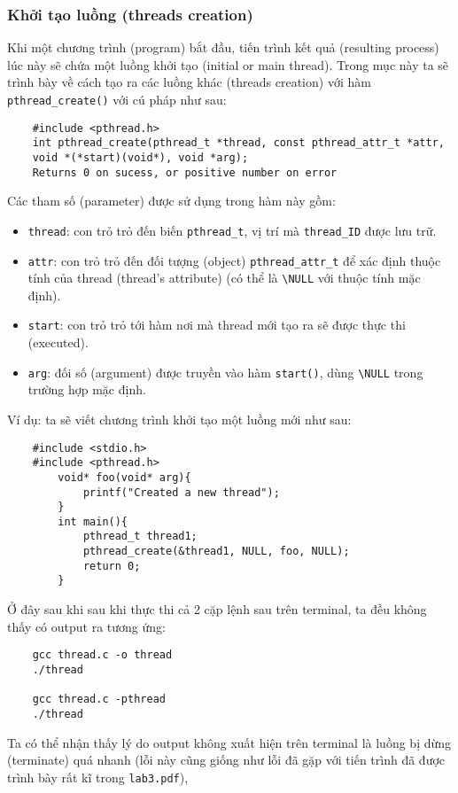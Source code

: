 \documentclass{article}
\begin{document}
\subsubsection{Khởi tạo luồng (threads creation)}
Khi một chương trình (program) bắt đầu, tiến trình kết quả (resulting process) lúc này sẽ chứa một luồng khởi tạo (initial or main thread).
Trong mục này ta sẽ trình bày về cách tạo ra các luồng khác (threads creation) với hàm \verb|pthread_create()| với cú pháp như sau:
\begin{verbatim}
    #include <pthread.h>
    int pthread_create(pthread_t *thread, const pthread_attr_t *attr, 
    void *(*start)(void*), void *arg);
    Returns 0 on sucess, or positive number on error
\end{verbatim}
Các tham số (parameter) được sử dụng trong hàm này gồm:
\begin{itemize}
    \item \verb|thread|: con trỏ trỏ đến biến \verb|pthread_t|, vị trí mà \verb|thread_ID| được lưu trữ.
    \item \verb|attr|: con trỏ trỏ đến đối tượng (object) \verb|pthread_attr_t| để xác định thuộc tính của thread (thread's attribute) (có thể là \verb|\NULL| với thuộc tính mặc định).
    \item \verb|start|: con trỏ trỏ tới hàm nơi mà thread mới tạo ra sẽ được thực thi (executed).
    \item \verb|arg|: đối số (argument) được truyền vào hàm \verb|start()|, dùng \verb|\NULL| trong trường hợp mặc định. 
\end{itemize}
Ví dụ: ta sẽ viết chương trình khởi tạo một luồng mới như sau:
\begin{verbatim}
    #include <stdio.h>
    #include <pthread.h>
        void* foo(void* arg){
            printf("Created a new thread");
        }
        int main(){
            pthread_t thread1;
            pthread_create(&thread1, NULL, foo, NULL);
            return 0;
        }    
\end{verbatim}
Ở đây sau khi sau khi thực thi cả 2 cặp lệnh sau trên terminal, ta đều không thấy có output ra tương ứng:
\begin{verbatim}
    gcc thread.c -o thread
    ./thread

    gcc thread.c -pthread
    ./thread
\end{verbatim}
Ta có thể nhận thấy lý do output không xuất hiện trên terminal là luồng bị dừng (terminate) quá nhanh (lỗi này cũng giống như lỗi đã gặp với tiến trình đã được trình bày rất kĩ trong \verb|lab3.pdf|), 
\end{document}
